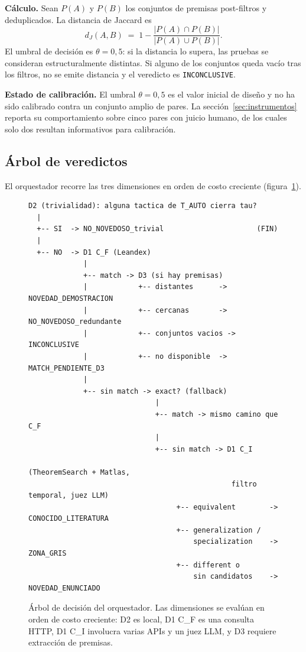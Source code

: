 \documentclass[12pt,a4paper]{article}
\theoremstyle{remark}
\begin{document}
\textbf{Cálculo.} Sean $P(A)$ y $P(B)$ los conjuntos de premisas post-filtros y deduplicados. La distancia de Jaccard es
\[
d_J(A,B) \;=\; 1 - \frac{|P(A) \cap P(B)|}{|P(A) \cup P(B)|}.
\]
El umbral de decisión es $\theta = 0{,}5$: si la distancia lo supera, las pruebas se consideran estructuralmente distintas. Si alguno de los conjuntos queda vacío tras los filtros, no se emite distancia y el veredicto es \texttt{INCONCLUSIVE}.

\textbf{Estado de calibración.} El umbral $\theta = 0{,}5$ es el valor inicial de diseño y no ha sido calibrado contra un conjunto amplio de pares. La sección~\ref{sec:instrumentos} reporta su comportamiento sobre cinco pares con juicio humano, de los cuales solo dos resultan informativos para calibración.

\subsection{Árbol de veredictos}

El orquestador recorre las tres dimensiones en orden de costo creciente (figura~\ref{fig:arbol}).

\begin{figure}[htbp]
\centering
\small
\begin{verbatim}
D2 (trivialidad): alguna tactica de T_AUTO cierra tau?
  |
  +-- SI  -> NO_NOVEDOSO_trivial                      (FIN)
  |
  +-- NO  -> D1 C_F (Leandex)
             |
             +-- match -> D3 (si hay premisas)
             |            +-- distantes      -> NOVEDAD_DEMOSTRACION
             |            +-- cercanas       -> NO_NOVEDOSO_redundante
             |            +-- conjuntos vacios -> INCONCLUSIVE
             |            +-- no disponible  -> MATCH_PENDIENTE_D3
             |
             +-- sin match -> exact? (fallback)
                              |
                              +-- match -> mismo camino que C_F
                              |
                              +-- sin match -> D1 C_I
                                               (TheoremSearch + Matlas,
                                                filtro temporal, juez LLM)
                                   +-- equivalent        -> CONOCIDO_LITERATURA
                                   +-- generalization /
                                       specialization    -> ZONA_GRIS
                                   +-- different o
                                       sin candidatos    -> NOVEDAD_ENUNCIADO
\end{verbatim}
\caption{Árbol de decisión del orquestador. Las dimensiones se evalúan en orden de costo creciente: D2 es local, D1 C\_F es una consulta HTTP, D1 C\_I involucra varias APIs y un juez LLM, y D3 requiere extracción de premisas.}
\label{fig:arbol}
\end{figure}
\end{document}
